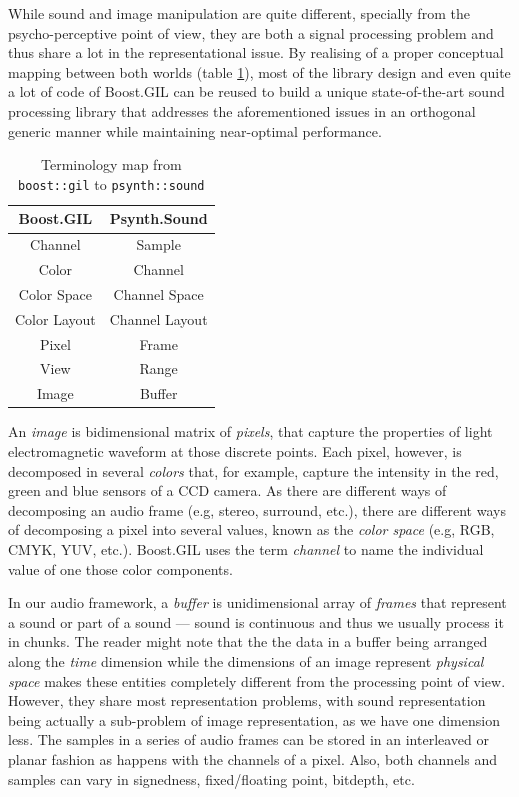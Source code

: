 While sound and image manipulation are quite different, specially from
the psycho-perceptive point of view, they are both a signal processing
problem and thus share a lot in the representational issue. By
realising of a proper conceptual mapping between both worlds (table
\ref{tab:gilmap}), most of the library design and even quite a lot of
code of Boost.GIL can be reused to build a unique state-of-the-art
sound processing library that addresses the aforementioned issues in
an orthogonal generic manner while maintaining near-optimal
performance.

\begin{table}[h]
  \centering
  \begin{tabular}{c|c}
    Boost.GIL & Psynth.Sound \\ \hline\hline
    Channel   & Sample \\
    Color     & Channel \\
    Color Space & Channel Space \\
    Color Layout & Channel Layout \\
    Pixel & Frame \\
    View & Range \\
    Image & Buffer
  \end{tabular}
  \caption{Terminology map from \texttt{boost::gil} to \texttt{psynth::sound}}
  \label{tab:gilmap}
\end{table}

An \emph{image} is bidimensional matrix of \emph{pixels}, that capture
the properties of light electromagnetic waveform at those discrete
points. Each pixel, however, is decomposed in several \emph{colors}
that, for example, capture the intensity in the red, green and blue
sensors of a CCD camera. As there are different ways of decomposing an
audio frame (e.g, stereo, surround, etc.), there are different ways of
decomposing a pixel into several values, known as the \emph{color
  space} (e.g, RGB, CMYK, YUV, etc.). Boost.GIL uses the term
\emph{channel} to name the individual value of one those color
components.

In our audio framework, a \emph{buffer} is unidimensional array of
\emph{frames} that represent a sound or part of a sound --- sound is
continuous and thus we usually process it in chunks. The reader might
note that the the data in a buffer being arranged along the
\emph{time} dimension while the dimensions of an image represent
\emph{physical space} makes these entities completely different from
the processing point of view. However, they share most representation
problems, with sound representation being actually a sub-problem of
image representation, as we have one dimension less. The samples in a
series of audio frames can be stored in an interleaved or planar
fashion as happens with the channels of a pixel. Also, both channels
and samples can vary in signedness, fixed/floating point, bitdepth,
etc.

